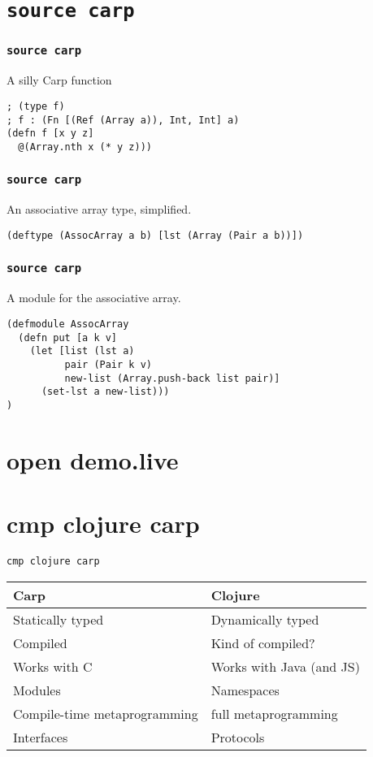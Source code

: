 \documentclass[aspectratio=169]{beamer}
\begin{document}
  \section{\texttt{source carp}}
  \begin{frame}[fragile]
  \frametitle{\texttt{source carp}}
    \begin{listing}[H]
      \caption{A silly Carp function}
      \begin{verbatim}
; (type f)
; f : (Fn [(Ref (Array a)), Int, Int] a)
(defn f [x y z]
  @(Array.nth x (* y z)))
      \end{verbatim}
    \end{listing}
  \end{frame}
  \begin{frame}[fragile]
    \frametitle{\texttt{source carp}}
    \begin{listing}[H]
      \caption{An associative array type, simplified.}
      \begin{verbatim}
(deftype (AssocArray a b) [lst (Array (Pair a b))])
      \end{verbatim}
    \end{listing}
  \end{frame}
  \begin{frame}[fragile]
    \frametitle{\texttt{source carp}}
    \begin{listing}[H]
      \caption{A module for the associative array.}
      \begin{verbatim}
(defmodule AssocArray
  (defn put [a k v]
    (let [list (lst a)
          pair (Pair k v)
          new-list (Array.push-back list pair)]
      (set-lst a new-list)))
)
      \end{verbatim}
    \end{listing}
  \end{frame}
  \section{open demo.live}
  \section{cmp clojure carp}
  \begin{frame}{\texttt{cmp clojure carp}}
    \begin{tabular}{ l | l }
      Carp & Clojure \\
      \hline
      \hline
      Statically typed & Dynamically typed \\ \hline
      Compiled & Kind of compiled? \\ \hline
      Works with C & Works with Java (and JS) \\ \hline
      \hline
      Modules & Namespaces \\ \hline
      Compile-time metaprogramming & full metaprogramming \\ \hline
      Interfaces & Protocols \\
    \end{tabular}
  \end{frame}
\end{document}

